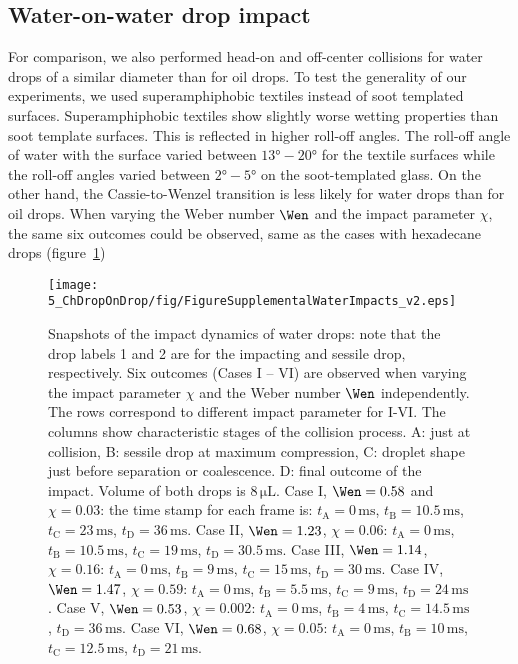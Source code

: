 \begin{subappendices}
	\section{Water-on-water drop impact}
	For comparison, we also performed head-on and off-center collisions for water drops of a similar diameter than for oil drops. To test the generality of our experiments, we used superamphiphobic textiles instead of soot templated surfaces. Superamphiphobic textiles show slightly worse wetting properties than soot template surfaces. This is reflected in higher roll-off angles. The roll-off angle of water with the surface varied between $13\si{\degree} - 20\si{\degree} $ for the textile surfaces while the roll-off angles varied between $2\si{\degree} - 5\si{\degree} $ on the soot-templated glass. On the other hand, the Cassie-to-Wenzel transition is less likely for water drops than for oil drops. When varying the Weber number $\Wen$ and the impact parameter $\chi$, the same six outcomes could be observed, same as the cases with hexadecane drops (figure~\ref{Ch5:FigSwater})
	
	\begin{figure}
		\centering
		\texttt{[image: 5\_ChDropOnDrop/fig/FigureSupplementalWaterImpacts\_v2.eps]}
		\caption{Snapshots of the impact dynamics of water drops: note that the drop labels 1 and 2 are for the impacting and sessile drop, respectively. Six outcomes (Cases I – VI) are observed when varying the impact parameter $\chi$ and the Weber number $\Wen$ independently. The rows correspond to different impact parameter for I-VI. The columns show characteristic stages of the collision process. A: just at collision, B: sessile drop at maximum compression, C: droplet shape just before separation or coalescence. D: final outcome of the impact. Volume of both drops is $8\,\si{\micro\liter}$. Case I, $\Wen = 0.58$ and $\chi = 0.03$: the time stamp for each frame is: $t_{\text{A}} = 0\,\si{\milli\second}$, $t_{\text{B}} = 10.5\,\si{\milli\second}$, $t_{\text{C}} = 23\,\si{\milli\second}$, $t_{\text{D}} = 36\,\si{\milli\second}$. Case II, $\Wen = 1.23$, $\chi = 0.06$: $t_{\text{A}} = 0\,\si{\milli\second}$, $t_{\text{B}} = 10.5\,\si{\milli\second}$, $t_{\text{C}} =19\,\si{\milli\second}$, $t_{\text{D}} = 30.5\,\si{\milli\second}$.  Case III, $\Wen = 1.14$, $\chi = 0.16$: $t_{\text{A}} = 0\,\si{\milli\second}$, $t_{\text{B}} = 9\,\si{\milli\second}$, $t_{\text{C}} = 15\,\si{\milli\second}$, $t_{\text{D}} = 30\,\si{\milli\second}$. Case IV, $\Wen = 1.47$, $\chi = 0.59$: $t_{\text{A}} = 0\,\si{\milli\second}$, $t_{\text{B}} = 5.5\,\si{\milli\second}$, $t_{\text{C}} = 9\,\si{\milli\second}$, $t_{\text{D}} = 24\,\si{\milli\second}$. Case V, $\Wen = 0.53$, $\chi = 0.002$: $t_{\text{A}} = 0\,\si{\milli\second}$, $t_{\text{B}} = 4\,\si{\milli\second}$, $t_{\text{C}} = 14.5\,\si{\milli\second}$, $t_{\text{D}} = 36\,\si{\milli\second}$. Case VI, $\Wen = 0.68$, $\chi = 0.05$: $t_{\text{A}} = 0\,\si{\milli\second}$, $t_{\text{B}} = 10\,\si{\milli\second}$, $t_{\text{C}} = 12.5\,\si{\milli\second}$, $t_{\text{D}} = 21\,\si{\milli\second}$.}
		\label{Ch5:FigSwater}
	\end{figure}


\end{subappendices}
